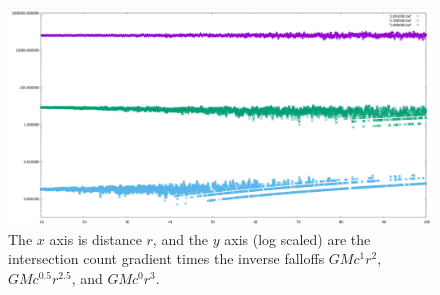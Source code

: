 \documentclass[12pt]{article}
\begin{document}
\begin{figure} 
\centering
  \includegraphics[width = 7 in]{multi_plot.png}
  \caption{
The $x$ axis is distance $r$, and the $y$ axis (log scaled) are the intersection count gradient times the inverse falloffs $GM c^{1} r^2$, $GM c^{0.5} r^{2.5}$, and $GM c^0 r^3$.
}
\end{figure}
\end{document}
